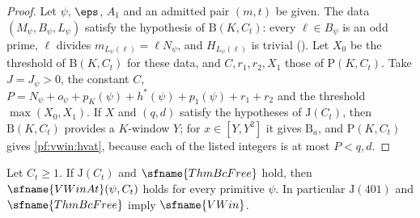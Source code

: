 \begin{proof}
Let $\psi$, $\eps$, $A_1$ and an admitted pair $(m,t)$ be given. The data $(M_\psi,B_\psi,L_\psi)$ satisfy the hypothesis
of $\mathrm{B}(K,C_t)$: every $\ell\in B_\psi$ is an odd prime, $\ell$ divides $m_{L_\psi(\ell)}=\ell N_\psi$, and
$H_{L_\psi(\ell)}$ is trivial (). Let $X_0$ be the threshold of
$\mathrm{B}(K,C_t)$ for these data, and $C,r_1,r_2,X_1$ those of $\mathrm{P}(K,C_t)$. Take $J=J_\psi>0$, the constant $C$,
$P=N_\psi+o_\psi+p_K(\psi)+h^*(\psi)+p_1(\psi)+r_1+r_2$ and the threshold $\max(X_0,X_1)$. If $X$ and $(q,d)$ satisfy the
hypotheses of $\mathrm{J}(C_t)$, then $\mathrm{B}(K,C_t)$ provides a $K$-window $Y$; for $x\in[Y,Y^2]$ it gives
$\mathrm{B}_a$, and $\mathrm{P}(K,C_t)$ gives \eqref{pf:vwin:hvat}, because each of the listed integers is at most $P<q,d$.
\end{proof}

\begin{proposition}\label{pf:vwin:assembly}
Let $C_t\ge1$. If $\mathrm{J}(C_t)$ and $\sfname{ThmBcFree}$ hold, then $\sfname{VWinAt}(\psi,C_t)$ holds for every
primitive $\psi$. In particular $\mathrm{J}(401)$ and $\sfname{ThmBcFree}$ imply $\sfname{VWin}$.
\end{proposition}

